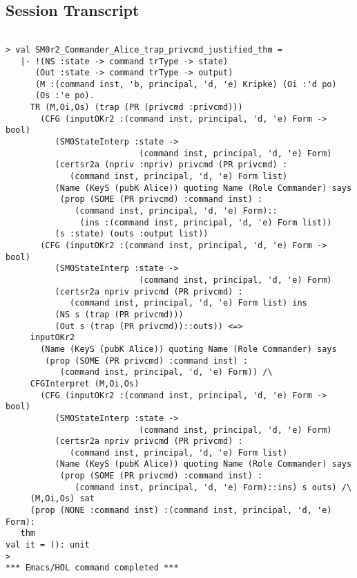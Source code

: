 \documentclass{report}
\begin{document}
\subsection{Session Transcript}
\label{trans2}
\begin{session}
  \begin{scriptsize}
\begin{verbatim}

> val SM0r2_Commander_Alice_trap_privcmd_justified_thm =
   |- !(NS :state -> command trType -> state)
      (Out :state -> command trType -> output)
      (M :(command inst, 'b, principal, 'd, 'e) Kripke) (Oi :'d po)
      (Os :'e po).
     TR (M,Oi,Os) (trap (PR (privcmd :privcmd)))
       (CFG (inputOKr2 :(command inst, principal, 'd, 'e) Form -> bool)
          (SM0StateInterp :state ->
                           (command inst, principal, 'd, 'e) Form)
          (certsr2a (npriv :npriv) privcmd (PR privcmd) :
             (command inst, principal, 'd, 'e) Form list)
          (Name (KeyS (pubK Alice)) quoting Name (Role Commander) says
           (prop (SOME (PR privcmd) :command inst) :
              (command inst, principal, 'd, 'e) Form)::
               (ins :(command inst, principal, 'd, 'e) Form list))
          (s :state) (outs :output list))
       (CFG (inputOKr2 :(command inst, principal, 'd, 'e) Form -> bool)
          (SM0StateInterp :state ->
                           (command inst, principal, 'd, 'e) Form)
          (certsr2a npriv privcmd (PR privcmd) :
             (command inst, principal, 'd, 'e) Form list) ins
          (NS s (trap (PR privcmd)))
          (Out s (trap (PR privcmd))::outs)) <=>
     inputOKr2
       (Name (KeyS (pubK Alice)) quoting Name (Role Commander) says
        (prop (SOME (PR privcmd) :command inst) :
           (command inst, principal, 'd, 'e) Form)) /\
     CFGInterpret (M,Oi,Os)
       (CFG (inputOKr2 :(command inst, principal, 'd, 'e) Form -> bool)
          (SM0StateInterp :state ->
                           (command inst, principal, 'd, 'e) Form)
          (certsr2a npriv privcmd (PR privcmd) :
             (command inst, principal, 'd, 'e) Form list)
          (Name (KeyS (pubK Alice)) quoting Name (Role Commander) says
           (prop (SOME (PR privcmd) :command inst) :
              (command inst, principal, 'd, 'e) Form)::ins) s outs) /\
     (M,Oi,Os) sat
     (prop (NONE :command inst) :(command inst, principal, 'd, 'e) Form):
   thm
val it = (): unit
> 
*** Emacs/HOL command completed ***


\end{verbatim}
  \end{scriptsize}
\end{session}
\end{document}
